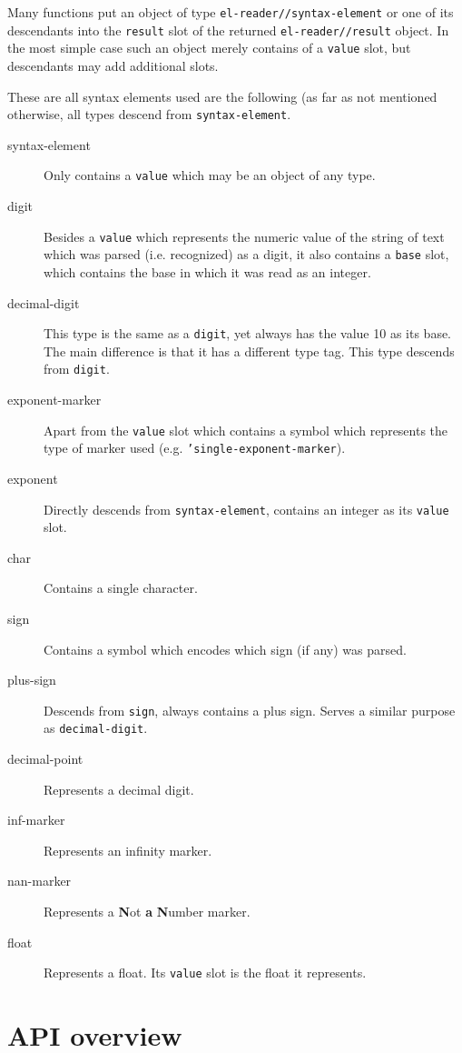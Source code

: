 \documentclass[a4paper,10pt,twoside]{report}
\newcommand{\sym}[1]{\texttt{#1}}
\begin{document}
Many functions put an object of type \sym{el-reader//syntax-element} or one of
its descendants into the \sym{result} slot of the returned
\sym{el-reader//result} object.  In the most simple case such an object merely
contains of a \sym{value} slot, but descendants may add additional slots.

These are all syntax elements used are the following (as far as not mentioned
otherwise, all types descend from \sym{syntax-element}.

\begin{description}
\item[syntax-element] Only contains a \sym{value} which may be an object of any
  type. 
\item[digit] Besides a \sym{value} which represents the numeric value of the
  string of text which was parsed (i.e. recognized) as a digit, it also contains
  a \sym{base} slot, which contains the base in which it was read as an integer.
\item[decimal-digit] This type is the same as a \sym{digit}, yet always has the
  value 10 as its base.  The main difference is that it has a different type
  tag.  This type descends from \sym{digit}.
\item[exponent-marker] Apart from the \sym{value} slot which contains a
  symbol which represents the type of marker used
  (e.g. \sym{'single-exponent-marker}).
\item[exponent] Directly descends from \sym{syntax-element}, contains an integer
  as its \sym{value} slot.
\item[char] Contains a single character.
\item[sign] Contains a symbol which encodes which sign (if any) was parsed.
\item[plus-sign] Descends from \sym{sign}, always contains a plus sign.  Serves
  a similar purpose as \sym{decimal-digit}.
\item[decimal-point] Represents a decimal digit.
\item[inf-marker] Represents an infinity marker.
\item[nan-marker] Represents a \textbf{N}ot \textbf{a} \textbf{N}umber marker.
\item[float] Represents a float.  Its \sym{value} slot is the float it
  represents.
\end{description}

\chapter{API overview}
\label{sec:api-overview}
\end{document}
